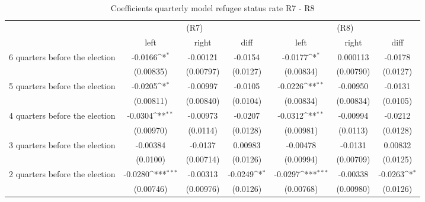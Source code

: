 \begin{table}[!ht]\centering \footnotesize
\def\sym#1{\ifmmode^{#1}\else\(^{#1}\)\fi}
\caption{Coefficients quarterly model refugee status rate R7 - R8}
\begin{tabular}{l*{6}{c}}
\hline\hline
                    &\multicolumn{3}{c}{(R7)}&\multicolumn{3}{c}{(R8)}\\
&\multicolumn{1}{c}{left}&\multicolumn{1}{c}{right}&\multicolumn{1}{c}{diff}&\multicolumn{1}{c}{left}&\multicolumn{1}{c}{right}&\multicolumn{1}{c}{diff}\\
\hline
 6 quarters before the election&     -0.0166\sym{*}  &    -0.00121         &     -0.0154         &     -0.0177\sym{*}  &    0.000113         &     -0.0178         \\
                    &   (0.00835)         &   (0.00797)         &    (0.0127)         &   (0.00834)         &   (0.00790)         &    (0.0127)         \\
[0,5em]
 5 quarters before the election&     -0.0205\sym{*}  &    -0.00997         &     -0.0105         &     -0.0226\sym{**} &    -0.00950         &     -0.0131         \\
                    &   (0.00811)         &   (0.00840)         &    (0.0104)         &   (0.00834)         &   (0.00834)         &    (0.0105)         \\
[0,5em]
 4 quarters before the election&     -0.0304\sym{**} &    -0.00973         &     -0.0207         &     -0.0312\sym{**} &    -0.00994         &     -0.0212         \\
                    &   (0.00970)         &    (0.0114)         &    (0.0128)         &   (0.00981)         &    (0.0113)         &    (0.0128)         \\
[0,5em]
 3 quarters before the election&    -0.00384         &     -0.0137         &     0.00983         &    -0.00478         &     -0.0131         &     0.00832         \\
                    &    (0.0100)         &   (0.00714)         &    (0.0126)         &   (0.00994)         &   (0.00709)         &    (0.0125)         \\
[0,5em]
 2 quarters before the election&     -0.0280\sym{***}&    -0.00313         &     -0.0249\sym{*}  &     -0.0297\sym{***}&    -0.00338         &     -0.0263\sym{*}  \\
                    &   (0.00746)         &   (0.00976)         &    (0.0126)         &   (0.00768)         &   (0.00980)         &    (0.0126)         \\

\end{tabular}
\end{table}
